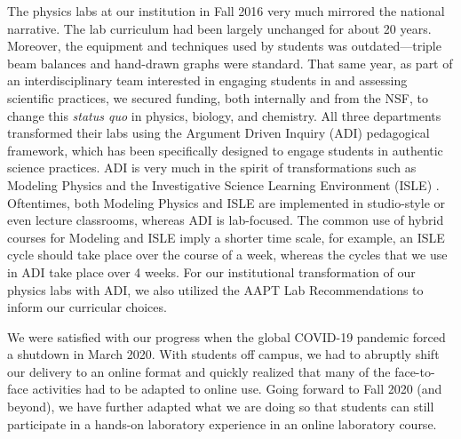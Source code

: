 \documentclass[aip, numerical, preprint]{revtex4-2}
\begin{document}

The physics labs at our institution in Fall 2016 very much mirrored the national narrative.
The lab curriculum had been largely unchanged for about 20 years. Moreover, the equipment and
techniques used by students was outdated---triple beam balances and hand-drawn graphs were
standard.  That same year, as part of an interdisciplinary team interested in engaging students
in and assessing scientific practices, we secured funding, both internally and from the NSF, to
change this \emph{status quo} in physics, biology, and chemistry.  All three departments
transformed their labs using the Argument Driven Inquiry
(ADI)\citep{Sampson2011,Walker2011,Walker2016} pedagogical framework, which has been
specifically designed to engage students in authentic science practices. ADI is very much in
the spirit of transformations such as Modeling Physics\cite{modelingBrewe2008} and the
Investigative Science Learning Environment (ISLE) \cite{etkina2007investigative}. Oftentimes,
both Modeling Physics and ISLE are implemented in studio-style or even lecture classrooms,
whereas ADI is lab-focused. The common use of hybrid courses for Modeling and ISLE imply a
shorter time scale, for example, an ISLE cycle should take place over the course of a week,
whereas the cycles that we use in ADI take place over 4 weeks. For our institutional
transformation of our physics labs with ADI, we also utilized the AAPT Lab Recommendations to
inform our curricular choices.\citep{kozminski2014aapt}

We were satisfied with our progress when the global COVID-19 pandemic forced a shutdown in
March 2020.  With students off campus, we had to abruptly shift our delivery to an online
format and quickly realized that many of the face-to-face activities had to be adapted to
online use.  Going forward to Fall 2020 (and beyond), we have further adapted what we are doing
so that students can still participate in a hands-on laboratory experience in an online
laboratory course.
\end{document}
